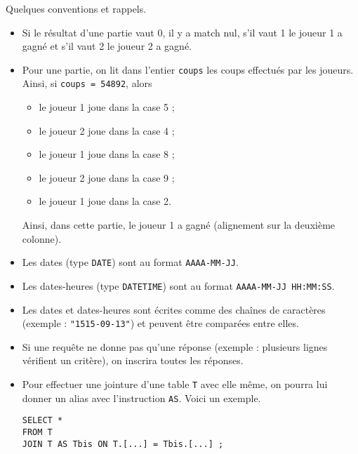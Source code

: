 Quelques conventions et rappels.
\begin{itemize}
  \item Si le résultat d'une partie vaut 0, il y a match nul, s'il vaut 1 le joueur 1 a gagné et s'il vaut 2 le joueur 2 a gagné.
  \item Pour une partie, on lit dans l'entier \texttt{coups} les coups effectués par les joueurs. Ainsi, si \texttt{coups = 54892}, alors 
    \begin{itemize}
      \item le joueur 1 joue dans la case 5 ;
      \item le joueur 2 joue dans la case 4 ;
      \item le joueur 1 joue dans la case 8 ;
      \item le joueur 2 joue dans la case 9 ;
      \item le joueur 1 joue dans la case 2.
    \end{itemize}
    Ainsi, dans cette partie, le joueur 1 a gagné (alignement sur la deuxième colonne). 
  \item Les dates (type \texttt{DATE}) sont au format \texttt{AAAA-MM-JJ}.
  \item Les dates-heures (type \texttt{DATETIME}) sont au format \texttt{AAAA-MM-JJ HH:MM:SS}. 
  \item Les dates et dates-heures sont écrites comme des chaînes de caractères (exemple : \texttt{"1515-09-13"}) et peuvent être comparées entre elles. 
  \item Si une requête ne donne pas qu'une réponse (exemple : plusieurs lignes vérifient un critère), on inscrira toutes les réponses. 
  \item Pour effectuer une jointure d'une table \texttt{T} avec elle même, on pourra lui donner un alias avec l'instruction \texttt{AS}. Voici un exemple.
\begin{verbatim}
SELECT *
FROM T
JOIN T AS Tbis ON T.[...] = Tbis.[...] ;
\end{verbatim}
\end{itemize}

